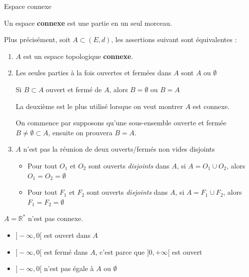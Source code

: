 \begin{Definition}[colbacktitle=red!75!black]{Espace connexe}{}
    \begin{center}
        Un espace \textbf{connexe} est une partie en un seul morceau. 
    \end{center}

Plus précisément, soit $A \subset (E,d)$, les assertions suivant sont équivalentes :
\begin{enumerate}
    \item $A$ est un espace topologique \textbf{connexe}.
    \item Les seules parties à la fois ouvertes et fermées dans $A$ sont $A$ ou $\emptyset$
        \begin{center}
            Si $B \subset A$ ouvert et fermé de $A$, alors $B = \emptyset$ ou  $B=A$
        \end{center}
\begin{note}
La deuxième est le plus utilisé lorsque on veut montrer $A$ est connexe.

On commence par supposons qu'une sous-ensemble ouverte et fermée $B \ne \emptyset \subset A$, ensuite on prouvera $B=A$.


\end{note}
        
    \item $A$ n'est pas la réunion de deux ouverts/fermés non vides disjoints
        \begin{itemize}
            \item Pour tout $O_1$ et  $O_2$ sont ouverts \textit{disjoints} dans $A$, si $A = O_1 \cup O_2$, alors $O_1 = O_2 = \emptyset$ 
            \item Pour tout $F_1$ et  $F_2$ sont ouverts \textit{disjoints} dans $A$, si $A = F_1 \cup F_2$, alors $F_1 = F_2 = \emptyset$ 
        \end{itemize}
\end{enumerate}

\end{Definition}




\begin{Example}{}{}
    $A = \mathbb{R} ^*$ n'est pas connexe.
\end{Example}

\begin{myproof}{}{}
  \begin{itemize}
      \item $]-\infty, 0[$ est ouvert dans  $A$
      \item $]-\infty, 0[$ est fermé dans  $A$, c'est parce que  $]0, +\infty[$ est ouvert
      \item $]-\infty, 0[$ n'est pas égale à $A$ ou  $\emptyset$ 
  \end{itemize}
\end{myproof}


